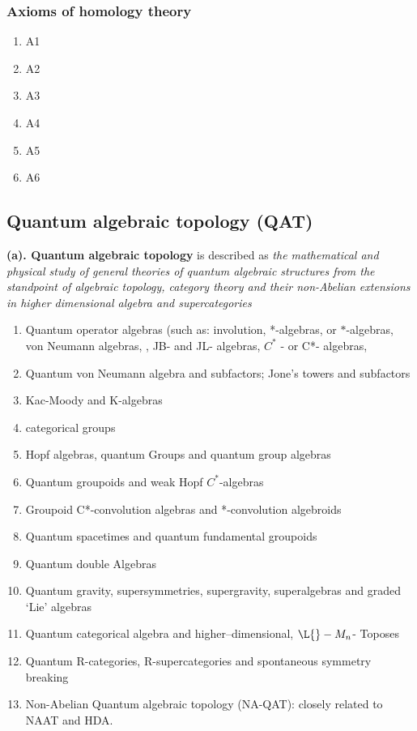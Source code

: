 \documentclass[12pt]{article}
\theoremstyle{plain}
\theoremstyle{definition}
\numberwithin{equation}{section}
\begin{document}
\subsubsection{Axioms of homology theory}
\begin{enumerate}

\item A1

\item A2
\item A3
\item A4
\item A5
\item A6

\end{enumerate}

\subsection{Quantum algebraic topology (QAT)} 

\textbf{(a). Quantum algebraic topology} is described as \emph{the mathematical and physical study of  general theories of quantum algebraic structures from the standpoint of algebraic topology, category theory and
their non-Abelian extensions in higher dimensional algebra and supercategories}
\begin{enumerate}
\item Quantum operator algebras (such as: involution, *-algebras, or $*$-algebras, von Neumann algebras,
, JB- and JL- algebras,   $C^*$ - or C*- algebras, 
\item Quantum von Neumann algebra and subfactors; Jone's towers and subfactors
\item Kac-Moody and K-algebras
\item categorical groups 
\item Hopf algebras, quantum Groups and quantum group algebras
\item Quantum groupoids and weak Hopf $C^*$-algebras
\item Groupoid C*-convolution algebras and *-convolution algebroids
\item Quantum spacetimes and quantum fundamental groupoids 
\item Quantum double Algebras
\item Quantum gravity, supersymmetries, supergravity, superalgebras and graded `Lie' algebras
\item Quantum categorical algebra and higher--dimensional, $\L{}-M_n$- Toposes
\item Quantum R-categories, R-supercategories and spontaneous symmetry breaking
\item Non-Abelian Quantum algebraic topology (NA-QAT): closely related to NAAT and HDA.
\end{enumerate}
\end{document}
